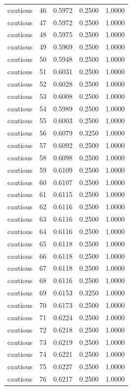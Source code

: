 \begin{tabular}{lrrrr}
cautious & 46 & 0.5972 & 0.2500 & 1.0000 \\
cautious & 47 & 0.5972 & 0.2500 & 1.0000 \\
cautious & 48 & 0.5975 & 0.2500 & 1.0000 \\
cautious & 49 & 0.5969 & 0.2500 & 1.0000 \\
cautious & 50 & 0.5948 & 0.2500 & 1.0000 \\
cautious & 51 & 0.6031 & 0.2500 & 1.0000 \\
cautious & 52 & 0.6028 & 0.2500 & 1.0000 \\
cautious & 53 & 0.6008 & 0.2500 & 1.0000 \\
cautious & 54 & 0.5989 & 0.2500 & 1.0000 \\
cautious & 55 & 0.6003 & 0.2500 & 1.0000 \\
cautious & 56 & 0.6079 & 0.3250 & 1.0000 \\
cautious & 57 & 0.6092 & 0.2500 & 1.0000 \\
cautious & 58 & 0.6098 & 0.2500 & 1.0000 \\
cautious & 59 & 0.6109 & 0.2500 & 1.0000 \\
cautious & 60 & 0.6107 & 0.2500 & 1.0000 \\
cautious & 61 & 0.6115 & 0.2500 & 1.0000 \\
cautious & 62 & 0.6116 & 0.2500 & 1.0000 \\
cautious & 63 & 0.6116 & 0.2500 & 1.0000 \\
cautious & 64 & 0.6116 & 0.2500 & 1.0000 \\
cautious & 65 & 0.6118 & 0.2500 & 1.0000 \\
cautious & 66 & 0.6118 & 0.2500 & 1.0000 \\
cautious & 67 & 0.6118 & 0.2500 & 1.0000 \\
cautious & 68 & 0.6116 & 0.2500 & 1.0000 \\
cautious & 69 & 0.6153 & 0.3250 & 1.0000 \\
cautious & 70 & 0.6173 & 0.2500 & 1.0000 \\
cautious & 71 & 0.6224 & 0.2500 & 1.0000 \\
cautious & 72 & 0.6218 & 0.2500 & 1.0000 \\
cautious & 73 & 0.6219 & 0.2500 & 1.0000 \\
cautious & 74 & 0.6221 & 0.2500 & 1.0000 \\
cautious & 75 & 0.6227 & 0.2500 & 1.0000 \\
cautious & 76 & 0.6217 & 0.2500 & 1.0000 \\

\end{tabular}
